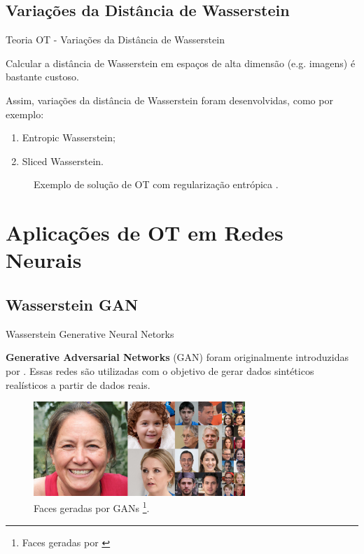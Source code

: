 \documentclass[10pt]{beamer}
\begin{document}
\subsection{Variações da Distância de Wasserstein}
\begin{frame}[fragile]{Teoria OT - Variações da Distância de Wasserstein}

	Calcular a distância de Wasserstein em espaços de alta dimensão (e.g. imagens)
	é bastante custoso.

	\vspace{3mm}
	Assim, variações da distância
	de Wasserstein foram desenvolvidas, como por exemplo:
	\begin{enumerate}
		\item Entropic Wasserstein;
		\item Sliced Wasserstein.
	\end{enumerate}

	\begin{figure}[H]
		\centering
		\def\svgscale{0.4}
		
		\caption{
			Exemplo de solução de OT com regularização entrópica
			\citep{sales2021optimal}.}
		\label{fig:pub}
	\end{figure}

\end{frame}

\AtBeginSection{}
\section[Aplicações OT]{Aplicações de OT em Redes Neurais}
\subsection[WGAN]{Wasserstein GAN}
\begin{frame}[fragile]{Wasserstein Generative Neural Netorks}

	\textbf{Generative Adversarial Networks} (GAN)
	foram originalmente introduzidas por \citet{goodfellow2014}.
	Essas redes são utilizadas com o objetivo de gerar
	dados sintéticos realísticos a partir de dados reais.

	\begin{figure}[H]
		\centering
		\includegraphics[width=8cm]{Figures/gans-faces.png}
		\caption{Faces geradas por GANs
			\footnote{Faces geradas por \citet{karras2018}}.}
	\end{figure}

\end{frame}
\end{document}
